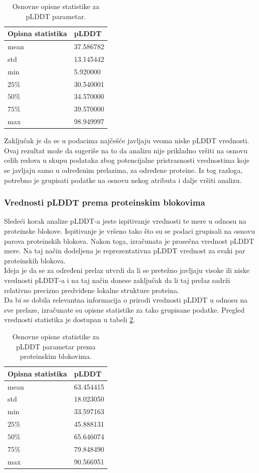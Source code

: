 \documentclass[a4paper,12pt]{article}
\begin{document}
\begin{table}[h!]
    \centering
    \begin{tabular}{ |l|l| } 
    \hline
    \textbf{Opisna statistika} & \textbf{pLDDT} \\
    \hline
    mean & 37.586782 \\
    std  & 13.145442 \\
    min  & 5.920000 \\
    $25\%$  & 30.540001 \\
    $50\%$   & 34.570000 	\\
    $75\%$ & 39.570000 	 \\
    max & 98.949997 	\\
    \hline
    \end{tabular}
    \caption{Osnovne opisne statistike za pLDDT parametar.}
    \label{Tabela:4}
\end{table}
\newpage
Zaključak je da se u podacima najčešće javljaju veoma niske pLDDT vrednosti. Ovaj rezultat može da sugeriše na to da analizu nije prikladno vršiti na osnovu celih redova u skupu podataka zbog potencijalne pristrasnosti vrednostima koje se javljaju samo u određenim prelazima, za određene proteine. Iz tog razloga, potrebno je grupisati podatke na osnovu nekog atributa i dalje vršiti analizu.
\subsubsection{Vrednosti pLDDT prema proteinskim blokovima}
Sledeći korak analize pLDDT-a jeste ispitivanje vrednosti te mere u odnosu na proteinske blokove. Ispitivanje je vršeno tako što su se podaci grupisali na osnovu parova proteinskih blokova. Nakon toga, izračunata je prosečna vrednost pLDDT mere. Na taj način dodeljena je reprezentativna pLDDT vrednost za svaki par proteinskih blokova. \\
Ideja je da se za određeni prelaz utvrdi da li se pretežno javljaju visoke ili niske vrednosti pLDDT-a i na taj način donese zaključak da li taj prelaz sadrži relativno precizno predviđene lokalne strukture proteina. \\
Da bi se dobila relevantna informacija o prirodi vrednosti pLDDT u odnosu na sve prelaze, izračunate su opisne statistike za tako grupisane podatke. Pregled vrednosti statistika je dostupan u tabeli \ref{Tabela:5}.
\begin{table}[h!]
    \centering
    \begin{tabular}{ |l|l| } 
    \hline
    \textbf{Opisna statistika} & \textbf{pLDDT} \\
    \hline
    mean & 63.454415 \\
    std  & 18.023050 \\
    min  & 33.597163 \\
    $25\%$  & 45.888131 \\
    $50\%$  & 65.646074 	\\
    $75\%$ &  79.848490\\
    max & 90.566951 	\\
    \hline
    \end{tabular}
    \caption{Osnovne opisne statistike za pLDDT parametar prema proteinskim blokovima.}
    \label{Tabela:5}
\end{table}
\end{document}
